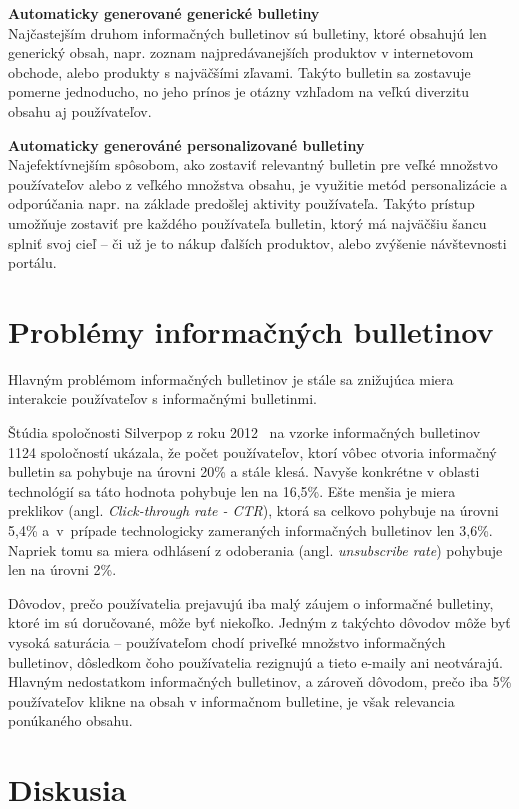 \textbf{Automaticky generované generické bulletiny}\\
Najčastejším druhom informačných bulletinov sú bulletiny, ktoré obsahujú len generický obsah, napr. zoznam najpredávanejších
produktov v internetovom obchode, alebo produkty s najväčšími zľavami. Takýto bulletin sa zostavuje pomerne jednoducho,
no jeho prínos je otázny vzhľadom na veľkú diverzitu obsahu aj používateľov.

\textbf{Automaticky generováné personalizované bulletiny}\\
Najefektívnejším spôsobom, ako zostaviť relevantný bulletin pre veľké množstvo používateľov alebo z veľkého množstva obsahu,
je využitie metód personalizácie a odporúčania napr. na základe predošlej aktivity používateľa. Takýto prístup umožňuje
zostaviť pre každého používateľa bulletin, ktorý má najväčšiu šancu splniť svoj cieľ -- či už je to nákup ďalších produktov,
alebo zvýšenie návštevnosti portálu.


\section{Problémy informačných bulletinov}
Hlavným problémom informačných bulletinov je stále sa znižujúca miera interakcie používateľov
s informačnými bulletinmi.

Štúdia spoločnosti Silverpop z roku 2012~\cite{mailmarketing} na vzorke informačných bulletinov 1124 spoločností ukázala,
že počet používateľov, ktorí vôbec otvoria informačný bulletin sa pohybuje na úrovni 20\% a stále klesá. Navyše konkrétne
v oblasti technológií sa táto hodnota pohybuje len na 16,5\%. Ešte menšia je miera preklikov
(angl. \emph{Click-through rate - CTR}), ktorá sa celkovo pohybuje na úrovni 5,4\% a~v~prípade technologicky zameraných
informačných bulletinov len 3,6\%. Napriek tomu sa miera odhlásení z odoberania (angl. \emph{unsubscribe rate}) pohybuje
len na úrovni 2\%.

Dôvodov, prečo používatelia prejavujú iba malý záujem o informačné bulletiny, ktoré im sú doručované, môže byť niekoľko.
Jedným z takýchto dôvodov môže byť vysoká saturácia -- používateľom chodí priveľké množstvo informačných bulletinov,
dôsledkom čoho používatelia rezignujú a tieto e-maily ani neotvárajú.
Hlavným nedostatkom informačných bulletinov, a zároveň dôvodom, prečo iba 5\% používateľov klikne na obsah v informačnom
bulletine, je však relevancia ponúkaného obsahu.


\section{Diskusia}

